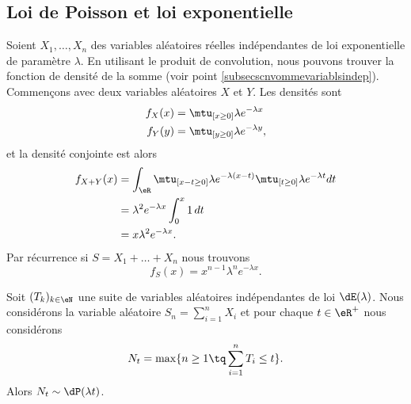 \subsection{Loi de Poisson et loi exponentielle}
\label{subsecPoissonetexpo}

Soient \( X_1,\ldots,X_n\) des variables aléatoires réelles indépendantes de loi exponentielle de paramètre \( \lambda\). En utilisant le produit de convolution, nous pouvons trouver la fonction de densité de la somme (voir point \ref{subsecscnvommevariablsindep}). Commençons avec deux variables aléatoires \( X\) et \( Y\). Les densités sont
\begin{subequations}
    \begin{align}
        f_X(x)&=\mtu_{[x\geq 0]}\lambda e^{-\lambda x}\\
        f_Y(y)&=\mtu_{[y\geq 0]}\lambda e^{-\lambda y},
    \end{align}
\end{subequations}
et la densité conjointe est alors
\begin{subequations}
    \begin{align}
        f_{X+Y}(x)&=\int_{\eR}\mtu_{[x-t\geq 0]}\lambda e^{-\lambda(x-t)}\mtu_{[t\geq 0]}\lambda e^{-\lambda t}dt\\
        &=\lambda^2 e^{-\lambda x}\int_0^x1\,dt\\
        &=x\lambda^2 e^{-\lambda x}.
    \end{align}
\end{subequations}
Par récurrence si \( S=X_1+\ldots+X_n\) nous trouvons
\begin{equation}
    f_S(x)=x^{n-1}\lambda^n e^{-\lambda x}.
\end{equation}

\begin{proposition}      \label{PropGMntiy}
Soit \( (T_k)_{k\in\eN}\) une suite de variables aléatoires indépendantes de loi \( \dE(\lambda)\). Nous considérons la variable aléatoire \( S_n=\sum_{i=1}^nX_i\) et pour chaque \( t\in\eR^+\) nous considérons
\begin{equation}
    N_t=\max\{ n\geq 1\tq \sum_{i=1}^nT_i\leq t \}.
\end{equation}
Alors \( N_t\sim\dP(\lambda t)\). 

\end{proposition}

